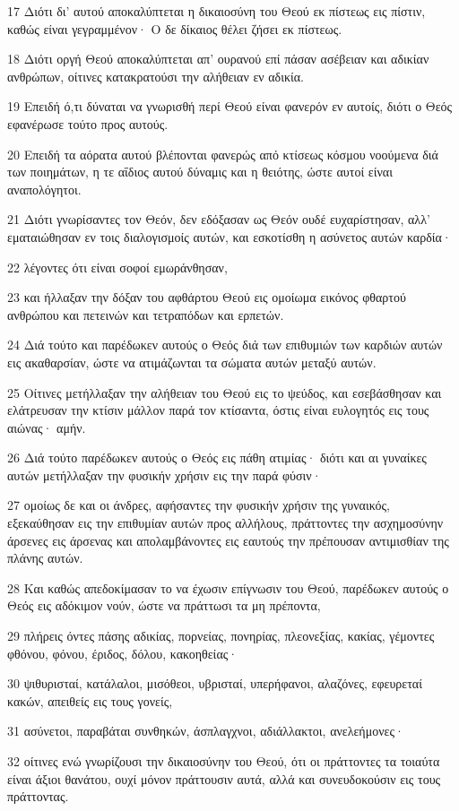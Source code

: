 \par 17 Διότι δι' αυτού αποκαλύπτεται η δικαιοσύνη του Θεού εκ πίστεως εις πίστιν, καθώς είναι γεγραμμένον· Ο δε δίκαιος θέλει ζήσει εκ πίστεως.
\par 18 Διότι οργή Θεού αποκαλύπτεται απ' ουρανού επί πάσαν ασέβειαν και αδικίαν ανθρώπων, οίτινες κατακρατούσι την αλήθειαν εν αδικία.
\par 19 Επειδή ό,τι δύναται να γνωρισθή περί Θεού είναι φανερόν εν αυτοίς, διότι ο Θεός εφανέρωσε τούτο προς αυτούς.
\par 20 Επειδή τα αόρατα αυτού βλέπονται φανερώς από κτίσεως κόσμου νοούμενα διά των ποιημάτων, η τε αΐδιος αυτού δύναμις και η θειότης, ώστε αυτοί είναι αναπολόγητοι.
\par 21 Διότι γνωρίσαντες τον Θεόν, δεν εδόξασαν ως Θεόν ουδέ ευχαρίστησαν, αλλ' εματαιώθησαν εν τοις διαλογισμοίς αυτών, και εσκοτίσθη η ασύνετος αυτών καρδία·
\par 22 λέγοντες ότι είναι σοφοί εμωράνθησαν,
\par 23 και ήλλαξαν την δόξαν του αφθάρτου Θεού εις ομοίωμα εικόνος φθαρτού ανθρώπου και πετεινών και τετραπόδων και ερπετών.
\par 24 Διά τούτο και παρέδωκεν αυτούς ο Θεός διά των επιθυμιών των καρδιών αυτών εις ακαθαρσίαν, ώστε να ατιμάζωνται τα σώματα αυτών μεταξύ αυτών.
\par 25 Οίτινες μετήλλαξαν την αλήθειαν του Θεού εις το ψεύδος, και εσεβάσθησαν και ελάτρευσαν την κτίσιν μάλλον παρά τον κτίσαντα, όστις είναι ευλογητός εις τους αιώνας· αμήν.
\par 26 Διά τούτο παρέδωκεν αυτούς ο Θεός εις πάθη ατιμίας· διότι και αι γυναίκες αυτών μετήλλαξαν την φυσικήν χρήσιν εις την παρά φύσιν·
\par 27 ομοίως δε και οι άνδρες, αφήσαντες την φυσικήν χρήσιν της γυναικός, εξεκαύθησαν εις την επιθυμίαν αυτών προς αλλήλους, πράττοντες την ασχημοσύνην άρσενες εις άρσενας και απολαμβάνοντες εις εαυτούς την πρέπουσαν αντιμισθίαν της πλάνης αυτών.
\par 28 Και καθώς απεδοκίμασαν το να έχωσιν επίγνωσιν του Θεού, παρέδωκεν αυτούς ο Θεός εις αδόκιμον νούν, ώστε να πράττωσι τα μη πρέποντα,
\par 29 πλήρεις όντες πάσης αδικίας, πορνείας, πονηρίας, πλεονεξίας, κακίας, γέμοντες φθόνου, φόνου, έριδος, δόλου, κακοηθείας·
\par 30 ψιθυρισταί, κατάλαλοι, μισόθεοι, υβρισταί, υπερήφανοι, αλαζόνες, εφευρεταί κακών, απειθείς εις τους γονείς,
\par 31 ασύνετοι, παραβάται συνθηκών, άσπλαγχνοι, αδιάλλακτοι, ανελεήμονες·
\par 32 οίτινες ενώ γνωρίζουσι την δικαιοσύνην του Θεού, ότι οι πράττοντες τα τοιαύτα είναι άξιοι θανάτου, ουχί μόνον πράττουσιν αυτά, αλλά και συνευδοκούσιν εις τους πράττοντας.

